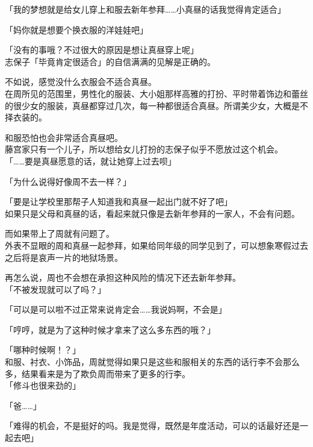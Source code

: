 「我的梦想就是给女儿穿上和服去新年参拜……小真昼的话我觉得肯定适合」

「妈你就是想要个换衣服的洋娃娃吧」

「没有的事哦？不过很大的原因是想让真昼穿上呢」\\

志保子「毕竟肯定很适合」的自信满满的见解是正确的。

不如说，感觉没什么衣服会不适合真昼。\\

在周所见的范围里，男性化的服装、大小姐那样高雅的打扮、平时带着饰边和蕾丝的很少女的服装，真昼都穿过几次，每一种都很适合真昼。所谓美少女，大概是不择衣装的。

和服恐怕也会非常适合真昼吧。\\

藤宫家只有一个儿子，所以想给女儿打扮的志保子似乎不愿放过这个机会。\\

「……要是真昼愿意的话，就让她穿上过去呗」

「为什么说得好像周不去一样？」

「要是让学校里那帮子人知道我和真昼一起出门就不好了吧」\\

如果只是父母和真昼的话，看起来就只像是去新年参拜的一家人，不会有问题。

而如果带上了周就有问题了。\\

外表不显眼的周和真昼一起参拜，如果给同年级的同学见到了，可以想象寒假过去之后将是哀声一片的地狱场景。

再怎么说，周也不会想在承担这种风险的情况下还去新年参拜。\\

「不被发现就可以了吗？」

「可以是可以啦不过正常来说肯定会……我说妈啊，不会是」

「哼哼，就是为了这种时候才拿来了这么多东西的哦？」

「哪种时候啊！？」\\

和服、衬衣、小饰品，周就觉得如果只是这些和服相关的东西的话行李不会那么多，结果看来是为了欺负周而带来了更多的行李。\\

「修斗也很来劲的」

「爸……」

「难得的机会，不是挺好的吗。我是觉得，既然是年度活动，可以的话最好还是一起去吧」\\

